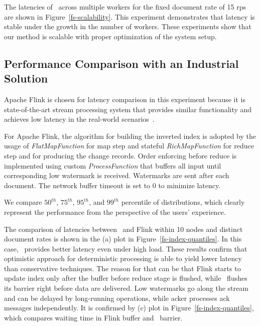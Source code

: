 The latencies of \FlameStream\ across multiple workers for the fixed document rate of 15 rps are shown in Figure~\ref{fs-scalability}. 
This experiment demonstrates that latency is stable  under  the growth in the number of workers.
%
These experiments show that our method is scalable with proper  optimization of  the system setup.

\subsection{Performance Comparison with an Industrial Solution}

Apache Flink is chosen for latency comparison in this experiment  because it is state-of-the-art stream processing system that provides similar functionality 
and achieves low latency in the real-world scenarios~\cite{S7530084}. 

For Apache Flink, the algorithm for building the inverted index is 
adopted 
by the usage of {\it FlatMapFunction} for map step and stateful {\it RichMapFunction} for reduce step and for producing the change records. 
Order enforcing before reduce is implemented using custom {\it ProcessFunction} that buffers all input until corresponding low watermark is received. Watermarks are sent after each document. The network buffer timeout is set to 0 to minimize latency.

We compare $50^{th}$, $75^{th}$, $95^{th}$, and $99^{th}$ percentile of distributions, which clearly represent the performance from the perspective of the users' experience.

The comparison of latencies between \FlameStream\ and Flink within 10 nodes and distinct document rates is shown in the (a) plot in Figure~\ref{fs-index-quantiles}. 
In this case, \FlameStream\ provides better  latency even under high load. 
These results confirm that optimistic approach for deterministic processing is able to yield  lower  latency than conservative techniques. 
The  reason for that  can be that Flink starts to update index only after the buffer before reduce stage is flushed, 
while  \FlameStream\ flushes its barrier right before data are delivered.
Low watermarks go along the stream and can be delayed by long-running operations, while acker processes ack messages independently. It is confirmed by (c) plot in Figure~\ref{fs-index-quantiles}, which compares  waiting time in Flink buffer and \FlameStream\ barrier.

